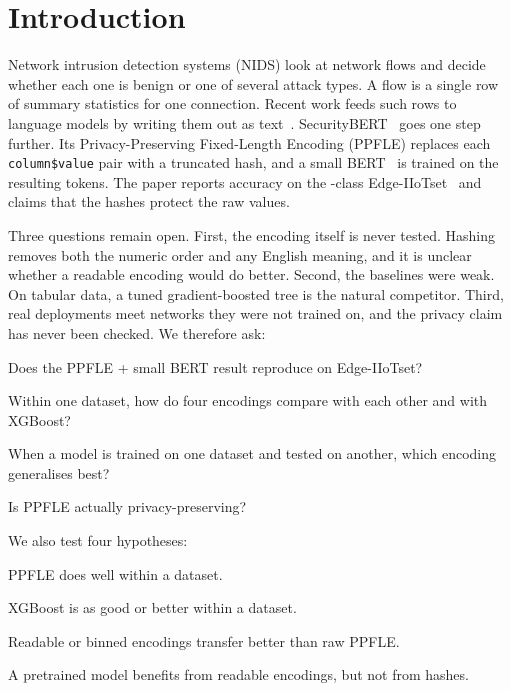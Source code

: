 \section{Introduction}\label{sec:intro}
Network intrusion detection systems (NIDS) look at network flows and decide whether each one is benign or one of
several attack types. A flow is a single row of summary statistics for one connection. Recent work feeds such rows to
language models by writing them out as text~\cite{hegselmann2022tabllm,borisov2022great}.
SecurityBERT~\cite{ferrag2024securitybert} goes one step further. Its Privacy-Preserving Fixed-Length Encoding (PPFLE)
replaces each \texttt{column\$value} pair with a truncated hash, and a small BERT~\cite{devlin2019bert} is trained on
the resulting tokens. The paper reports  accuracy on the -class
Edge-IIoTset~\cite{ferrag2022edge} and claims that the hashes protect the raw values.

Three questions remain open. First, the encoding itself is never tested. Hashing removes both the numeric order and
any English meaning, and it is unclear whether a readable encoding would do better. Second, the baselines were weak.
On tabular data, a tuned gradient-boosted tree is the natural competitor. Third, real deployments meet networks they
were not trained on, and the privacy claim has never been checked. We therefore ask:
\begin{description}[leftmargin=3.2em, labelwidth=2.6em, font=\bfseries]
  \item[RQ1] Does the PPFLE + small BERT result reproduce on Edge-IIoTset?
  \item[RQ2] Within one dataset, how do four encodings compare with each other and with XGBoost?
  \item[RQ3] When a model is trained on one dataset and tested on another, which encoding generalises best?
  \item[RQ4] Is PPFLE actually privacy-preserving?
\end{description}
We also test four hypotheses:
\begin{description}[leftmargin=3.2em, labelwidth=2.6em, font=\bfseries, itemsep=0pt]
  \item[H1] PPFLE does well within a dataset.
  \item[H2] XGBoost is as good or better within a dataset.
  \item[H3] Readable or binned encodings transfer better than raw PPFLE.
  \item[H4] A pretrained model benefits from readable encodings, but not from hashes.
\end{description}

